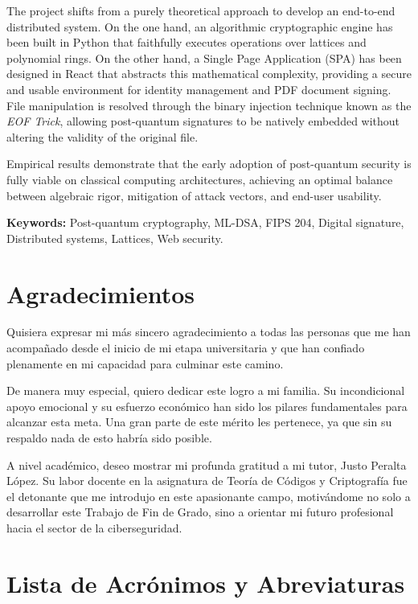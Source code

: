 \documentclass[11pt, a4paper]{report}
\theoremstyle{definition}
\begin{document}
The project shifts from a purely theoretical approach to develop an end-to-end distributed system. On the one hand, an algorithmic cryptographic engine has been built in Python that faithfully executes operations over lattices and polynomial rings. On the other hand, a Single Page Application (SPA) has been designed in React that abstracts this mathematical complexity, providing a secure and usable environment for identity management and PDF document signing. File manipulation is resolved through the binary injection technique known as the \textit{EOF Trick}, allowing post-quantum signatures to be natively embedded without altering the validity of the original file.

Empirical results demonstrate that the early adoption of post-quantum security is fully viable on classical computing architectures, achieving an optimal balance between algebraic rigor, mitigation of attack vectors, and end-user usability.

\vspace{0.5cm}
\noindent \textbf{Keywords:} Post-quantum cryptography, ML-DSA, FIPS 204, Digital signature, Distributed systems, Lattices, Web security.

\chapter*{Agradecimientos}
Quisiera expresar mi más sincero agradecimiento a todas las personas que me han acompañado desde el inicio de mi etapa universitaria y que han confiado plenamente en mi capacidad para culminar este camino. 

De manera muy especial, quiero dedicar este logro a mi familia. Su incondicional apoyo emocional y su esfuerzo económico han sido los pilares fundamentales para alcanzar esta meta. Una gran parte de este mérito les pertenece, ya que sin su respaldo nada de esto habría sido posible.

A nivel académico, deseo mostrar mi profunda gratitud a mi tutor, Justo Peralta López. Su labor docente en la asignatura de Teoría de Códigos y Criptografía fue el detonante que me introdujo en este apasionante campo, motivándome no solo a desarrollar este Trabajo de Fin de Grado, sino a orientar mi futuro profesional hacia el sector de la ciberseguridad.

\newpage

\tableofcontents
\listoffigures 
\listoftables  
\newpage

\newpage
\chapter*{Lista de Acrónimos y Abreviaturas}
\end{document}
